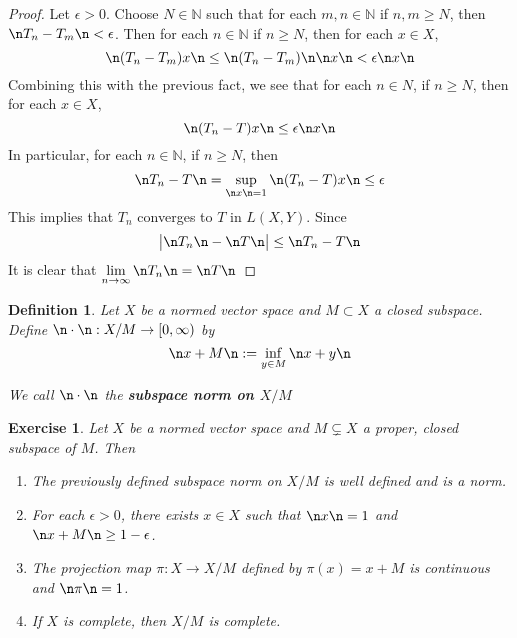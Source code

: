 \documentclass[12pt]{amsart}
\newtheorem{defn}[thm]{Definition}
\newtheorem{ex}[thm]{Exercise}
\newcommand{\ep}{\epsilon}
\newcommand{\N}{\mathbb{N}}
\newcommand{\Rg}{[0,\infty)}
\newcommand{\limn}{\lim \limits_{n \rightarrow \infty}}
\begin{document}
\begin{proof}
	Let $\ep >0 $. Choose $N \in \N$ such that for each $m, n \in \N$ if $n,m \geq N$, then $\n T_n - T_m \n < \ep$. Then for each $n \in \N$ if $n \geq N$, then for each $x \in X$, $$\n (T_n-T_m)x\n \leq \n (T_n-T_m)\n \n x \n < \ep \n x\n$$ Combining this with the previous fact, we see that for each $n \in N$, if $n \geq N$, then for each $x \in X$, $$\n (T_n -T) x\n \leq \ep \n x \n$$ In particular, for each $n \in \N$, if $n \geq N$, then $$ \n T_n -T \n = \sup\limits_{\n x \n = 1}\n (T_n - T)x \n \leq \ep$$ This implies that $T_n$ converges to $T$ in $L(X,Y)$. 
	Since $$\big\vert \n T_n \n - \n T \n\big \vert \leq \n T_n - T \n$$ It is clear that $\limn \n T_n \n = \n T \n$
\end{proof}

\begin{defn}
	Let $X$ be a normed vector space and $M \subset X$ a closed subspace. Define $\n \cdot\n :X/M \rightarrow \Rg$ by $$\n x+M\n  := \inf_{y \in M}\n x+y\n $$
	
	We call $\n \cdot\n $ the \textbf{subspace norm on $X/M$}
\end{defn}

\begin{ex}
	Let $X$ be a normed vector space and $M \subsetneq X$ a proper, closed subspace of $M$. 
	Then 
	\begin{enumerate}
		\item The previously defined subspace norm on $X/M$ is well defined and is a norm. 
		\item For each $\ep > 0$, there exists $x \in X$ such that $\n x\n =1$ and $\n x+M\n  \geq 1-\ep$.
		\item The projection map $\pi:X \rightarrow X/M$ defined by $\pi(x) = x+M$ is continuous and $\n \pi\n =1$. 
		\item If $X$ is complete, then $X/M$ is complete. 
	\end{enumerate} 
\end{ex}
\end{document}
